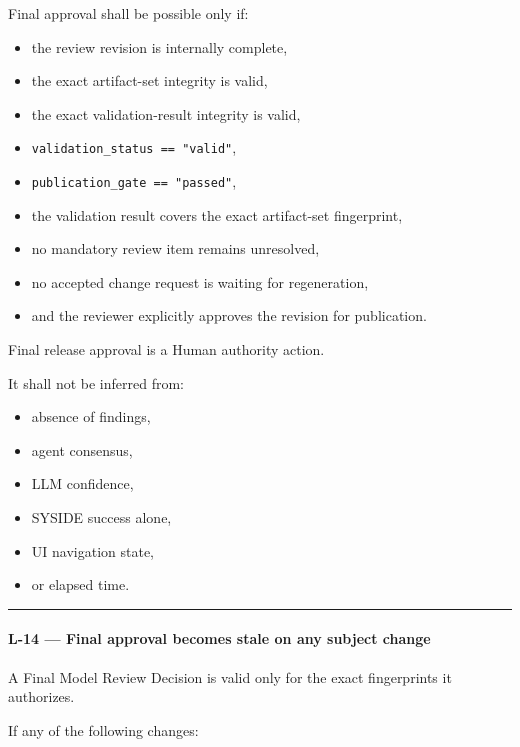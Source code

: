 Final approval shall be possible only if:

\begin{itemize}
\tightlist
\item
  the review revision is internally complete,
\item
  the exact artifact-set integrity is valid,
\item
  the exact validation-result integrity is valid,
\item
  \texttt{validation\_status\ ==\ "valid"},
\item
  \texttt{publication\_gate\ ==\ "passed"},
\item
  the validation result covers the exact artifact-set fingerprint,
\item
  no mandatory review item remains unresolved,
\item
  no accepted change request is waiting for regeneration,
\item
  and the reviewer explicitly approves the revision for publication.
\end{itemize}

Final release approval is a Human authority action.

It shall not be inferred from:

\begin{itemize}
\tightlist
\item
  absence of findings,
\item
  agent consensus,
\item
  LLM confidence,
\item
  SYSIDE success alone,
\item
  UI navigation state,
\item
  or elapsed time.
\end{itemize}

\begin{center}\rule{0.5\linewidth}{0.5pt}\end{center}

\hypertarget{l-14--final-approval-becomes-stale-on-any-subject-change}{%
\paragraph{L-14 --- Final approval becomes stale on any subject change}\label{l-14--final-approval-becomes-stale-on-any-subject-change}}

A Final Model Review Decision is valid only for the exact fingerprints it authorizes.

If any of the following changes:

